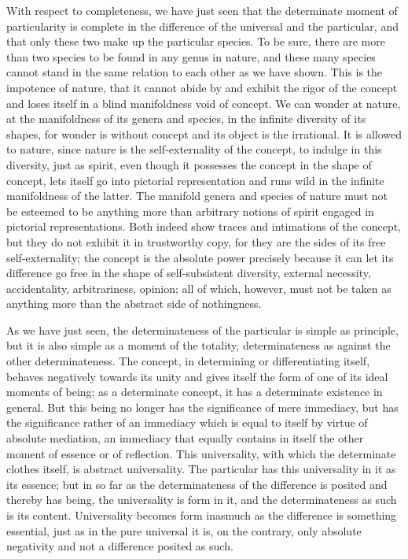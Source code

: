With respect to completeness,
we have just seen that the determinate moment
of  particularity is complete in the difference
of the universal and the particular,
and that only these two make up the particular species.
To be sure, there are more than two species
to be found in any genus in nature,
and these many species cannot stand
in the same relation to each other
as we have shown.
This is the impotence of nature,
that it cannot abide by and exhibit the rigor of the concept
and loses itself in a blind manifoldness void of concept.
We can wonder at nature,
at the manifoldness of its genera and species,
in the infinite diversity of its shapes,
for wonder is without concept
and its object is the irrational.
It is allowed to nature,
since nature is the self-externality of the concept,
to indulge in this diversity,
just as spirit, even though it possesses
the concept in the shape of concept,
lets itself go into pictorial representation
and runs wild in the infinite manifoldness of the latter.
The manifold genera and species of nature must not be
esteemed to be anything more than arbitrary notions of spirit
engaged in pictorial representations.
Both indeed show traces and intimations of the concept,
but they do not exhibit it in trustworthy copy,
for they are the sides of its free self-externality;
the concept is the absolute power precisely
because it can let its difference go free
in the shape of self-subsistent diversity,
external necessity, accidentality, arbitrariness, opinion;
all of which, however, must not be taken as anything
more than the abstract side of nothingness.

As we have just seen, the determinateness of
the particular is simple as principle,
but it is also simple as a moment of the totality,
determinateness as against the other determinateness.
The concept, in determining or differentiating itself,
behaves negatively towards its unity
and gives itself the form of one
of its ideal moments of being;
as a determinate concept,
it has a determinate existence in general.
But this being no longer has
the significance of mere immediacy,
but has the significance rather of an immediacy
which is equal to itself by virtue of absolute mediation,
an immediacy that equally contains in itself
the other moment of essence or of reflection.
This universality, with which the determinate clothes itself,
is abstract universality.
The particular has this universality in it as its essence;
but in so far as the determinateness
of the difference is posited
and thereby has being,
the universality is form in it,
and the determinateness as such is its content.
Universality becomes form inasmuch as
the difference is something essential,
just as in the pure universal it is, on the contrary,
only absolute negativity
and not a difference posited as such.

